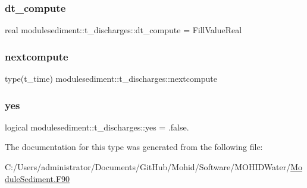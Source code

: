 \subsubsection{\texorpdfstring{dt\+\_\+compute}{dt\_compute}}
{\footnotesize\ttfamily real modulesediment\+::t\+\_\+discharges\+::dt\+\_\+compute = Fill\+Value\+Real\hspace{0.3cm}{\ttfamily [private]}}

\mbox{\label{structmodulesediment_1_1t__discharges_a036f35216074b113823fa127f20196ea}} 
\subsubsection{\texorpdfstring{nextcompute}{nextcompute}}
{\footnotesize\ttfamily type(t\+\_\+time) modulesediment\+::t\+\_\+discharges\+::nextcompute\hspace{0.3cm}{\ttfamily [private]}}

\mbox{\label{structmodulesediment_1_1t__discharges_a01d5271b8679111b3b34ea865a1cf69c}} 
\subsubsection{\texorpdfstring{yes}{yes}}
{\footnotesize\ttfamily logical modulesediment\+::t\+\_\+discharges\+::yes = .false.\hspace{0.3cm}{\ttfamily [private]}}



The documentation for this type was generated from the following file\+:\begin{DoxyCompactItemize}
\item 
C\+:/\+Users/administrator/\+Documents/\+Git\+Hub/\+Mohid/\+Software/\+M\+O\+H\+I\+D\+Water/\mbox{\hyperlink{_module_sediment_8_f90}{Module\+Sediment.\+F90}}\end{DoxyCompactItemize}
